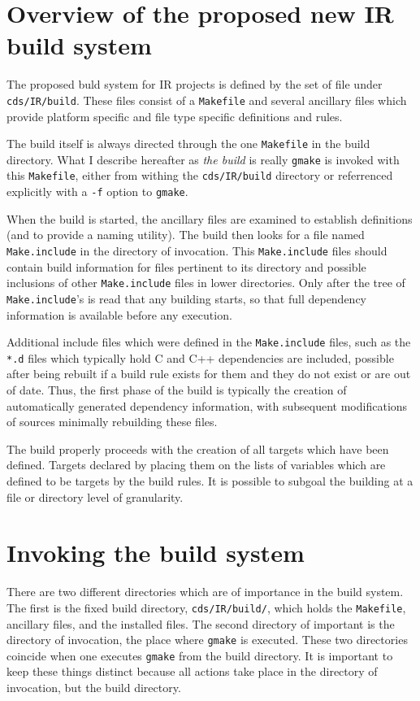 \documentclass[letterpaper]{article}
\begin{document}
\section{Overview of the proposed new IR build system}

The proposed buld system for IR projects is defined by the set of
file under \verb+cds/IR/build+.  These files consist of a \verb+Makefile+
and several ancillary files which provide platform specific and file
type specific definitions and rules.

The build itself is always directed through the one \verb+Makefile+ in
the build directory.  What I describe hereafter as {\em the build} is
really \verb+gmake+ is invoked with this \verb+Makefile+, either from
withing the \verb+cds/IR/build+ directory or referrenced explicitly
with a \verb+-f+ option to \verb+gmake+.

When the build is started, the ancillary files are examined to
establish definitions (and to provide a naming utility).  The build
then looks for a file named \verb+Make.include+ in the directory of
invocation.  This \verb+Make.include+ files should contain build
information for files pertinent to its directory and possible
inclusions of other \verb+Make.include+ files in lower directories.
Only after the tree of \verb+Make.include+'s is read that any building
starts, so that full dependency information is available before any
execution.

Additional include files which were defined in the \verb+Make.include+
files, such as the \verb+*.d+ files which typically hold C and C++
dependencies are included, possible after being rebuilt if a build
rule exists for them and they do not exist or are out of date.  Thus,
the first phase of the build is typically the creation of automatically
generated dependency information, with subsequent modifications of
sources minimally rebuilding these files.

The build properly proceeds with the creation of all targets which
have been defined.  Targets declared by placing them on the lists of
variables which are defined to be targets by the build rules.  It
is possible to subgoal the building at a file or directory level of
granularity.

\section{Invoking the build system}

There are two different directories which are of importance in the
build system.  The first is the fixed build directory, \verb+cds/IR/build/+,
which holds the \verb+Makefile+, ancillary files, and the installed files.
The second directory of important is the directory of invocation, the
place where \verb+gmake+ is executed.  These two directories coincide when
one executes \verb+gmake+ from the build directory.  It is important to
keep these things distinct because all actions take place in the directory
of invocation, but the build directory.
\end{document}
